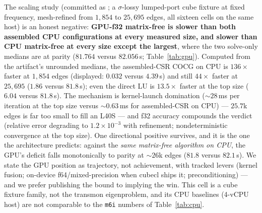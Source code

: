\documentclass{anvil-paper}
\begin{document}
The scaling study (committed as
; a $\sigma$-lossy
lumped-port cube fixture at fixed frequency, mesh-refined from $1{,}854$
to $25{,}695$ edges, all sixteen cells on the same host) is an honest
negative: \textbf{GPU-f32 matrix-free is slower than both assembled CPU
configurations at every measured size, and slower than CPU matrix-free
at every size except the largest}, where the two solve-only medians are
at parity ($81.764$ versus $82.056$\,s; Table~\ref{tab:gpu}). Computed from the
artifact's unrounded medians, the assembled-CSR COCG on CPU is
$136\times$ faster at $1{,}854$ edges (displayed: $0.032$ versus
$4.39$\,s) and still $44\times$
faster at $25{,}695$ ($1.86$ versus $81.8$\,s); even the direct LU is
$13.5\times$ faster at the top size ($6.04$ versus $81.8$\,s). The
mechanism is kernel-launch domination (${\sim}28$\,ms per iteration at
the top size versus ${\sim}0.63$\,ms for assembled-CSR on CPU) ---
$25.7$k edges is far too small to fill an L40S --- and f32 accuracy
compounds the verdict (relative error degrading to $1.2\times10^{-3}$
with refinement; nondeterministic convergence at the top size). One
directional positive survives, and it is the one the architecture
predicts: against the \emph{same matrix-free algorithm on CPU}, the
GPU's deficit falls monotonically to parity at ${\sim}26$k edges
($81.8$ versus $82.1$\,s). We state the GPU position as trajectory, not
achievement, with tracked levers (kernel fusion; on-device
f64/mixed-precision when cubecl ships it; preconditioning) --- and we
prefer publishing the bound to implying the win. This cell is a cube
fixture family, not the transmon eigenproblem, and its CPU baselines
(4-vCPU host) are not comparable to the \texttt{m6i} numbers of
Table~\ref{tab:cpu}.
\end{document}

